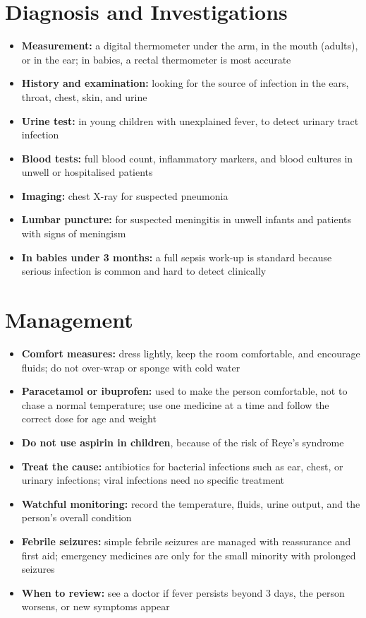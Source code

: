 \section*{Diagnosis and Investigations}
\begin{itemize}
    \item \textbf{Measurement:} a digital thermometer under the arm, in the mouth (adults), or in the ear; in babies, a rectal thermometer is most accurate
    \item \textbf{History and examination:} looking for the source of infection in the ears, throat, chest, skin, and urine
    \item \textbf{Urine test:} in young children with unexplained fever, to detect urinary tract infection
    \item \textbf{Blood tests:} full blood count, inflammatory markers, and blood cultures in unwell or hospitalised patients
    \item \textbf{Imaging:} chest X-ray for suspected pneumonia
    \item \textbf{Lumbar puncture:} for suspected meningitis in unwell infants and patients with signs of meningism
    \item \textbf{In babies under 3 months:} a full sepsis work-up is standard because serious infection is common and hard to detect clinically
\end{itemize}

\section*{Management}
\begin{itemize}
    \item \textbf{Comfort measures:} dress lightly, keep the room comfortable, and encourage fluids; do not over-wrap or sponge with cold water
    \item \textbf{Paracetamol or ibuprofen:} used to make the person comfortable, not to chase a normal temperature; use one medicine at a time and follow the correct dose for age and weight
    \item \textbf{Do not use aspirin in children}, because of the risk of Reye's syndrome
    \item \textbf{Treat the cause:} antibiotics for bacterial infections such as ear, chest, or urinary infections; viral infections need no specific treatment
    \item \textbf{Watchful monitoring:} record the temperature, fluids, urine output, and the person's overall condition
    \item \textbf{Febrile seizures:} simple febrile seizures are managed with reassurance and first aid; emergency medicines are only for the small minority with prolonged seizures
    \item \textbf{When to review:} see a doctor if fever persists beyond 3 days, the person worsens, or new symptoms appear
\end{itemize}

